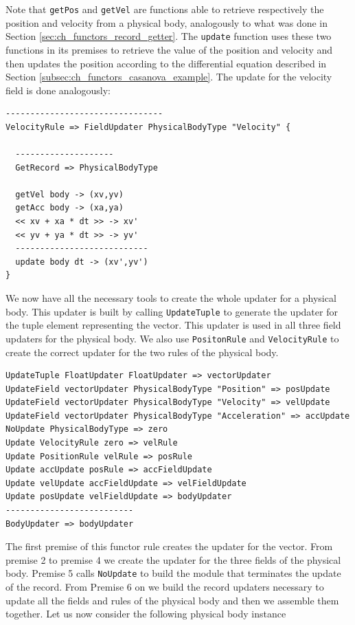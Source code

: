 \noindent
Note that \texttt{getPos} and \texttt{getVel} are functions able to retrieve respectively the position and velocity from a physical body, analogously to what was done in Section \ref{sec:ch_functors_record_getter}. The \texttt{update} function uses these two functions in its premises to retrieve the value of the position and velocity and then updates the position according to the differential equation described in Section \ref{subsec:ch_functors_casanova_example}. The update for the velocity field is done analogously:

\begin{lstlisting}
--------------------------------
VelocityRule => FieldUpdater PhysicalBodyType "Velocity" {

  --------------------
  GetRecord => PhysicalBodyType

  getVel body -> (xv,yv)
  getAcc body -> (xa,ya)
  << xv + xa * dt >> -> xv'
  << yv + ya * dt >> -> yv'
  ---------------------------
  update body dt -> (xv',yv')
}
\end{lstlisting}

\noindent
We now have all the necessary tools to create the whole updater for a physical body. This updater is built by calling \texttt{UpdateTuple} to generate the updater for the tuple element representing the vector. This updater is used in all three field updaters for the physical body. We also use \texttt{PositonRule} and \texttt{VelocityRule} to create the correct updater for the two rules of the physical body.

\begin{lstlisting}
UpdateTuple FloatUpdater FloatUpdater => vectorUpdater
UpdateField vectorUpdater PhysicalBodyType "Position" => posUpdate  
UpdateField vectorUpdater PhysicalBodyType "Velocity" => velUpdate  
UpdateField vectorUpdater PhysicalBodyType "Acceleration" => accUpdate
NoUpdate PhysicalBodyType => zero
Update VelocityRule zero => velRule
Update PositionRule velRule => posRule
Update accUpdate posRule => accFieldUpdate
Update velUpdate accFieldUpdate => velFieldUpdate
Update posUpdate velFieldUpdate => bodyUpdater
--------------------------
BodyUpdater => bodyUpdater
\end{lstlisting}

\noindent
The first premise of this functor rule creates the updater for the vector. From premise 2 to premise 4 we create the updater for the three fields of the physical body. Premise 5 calls \texttt{NoUpdate} to build the module that terminates the update of the record. From Premise 6 on we build the record updaters necessary to update all the fields and rules of the physical body and then we assemble them together.
Let us now consider the following physical body instance

